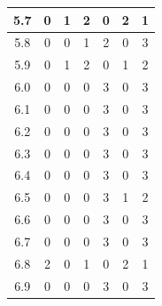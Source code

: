 \documentclass[11pt]{jreport}
\begin{document}
\begin{table}[H]
{\begin{tabular}{c|c|c|c|c|c|c}
    5.7 & 0 & 1 & 2 & 0 & 2 & 1 \\
    \hline
    5.8 & 0 & 0 & 1 & 2 & 0 & 3 \\
    \hline
    5.9 & 0 & 1 & 2 & 0 & 1 & 2 \\
    \hline
    6.0 & 0 & 0 & 0 & 3 & 0 & 3 \\
    \hline
    6.1 & 0 & 0 & 0 & 3 & 0 & 3 \\
    \hline
    6.2 & 0 & 0 & 0 & 3 & 0 & 3 \\
    \hline
    6.3 & 0 & 0 & 0 & 3 & 0 & 3 \\
    \hline
    6.4 & 0 & 0 & 0 & 3 & 0 & 3 \\
    \hline
    6.5 & 0 & 0 & 0 & 3 & 1 & 2 \\
    \hline
    6.6 & 0 & 0 & 0 & 3 & 0 & 3 \\
    \hline
    6.7 & 0 & 0 & 0 & 3 & 0 & 3 \\
    \hline
    6.8 & 2 & 0 & 1 & 0 & 2 & 1 \\
    \hline
    6.9 & 0 & 0 & 0 & 3 & 0 & 3 \\
    \hline
    \end{tabular}
    }
\end{table} 
\end{document}
